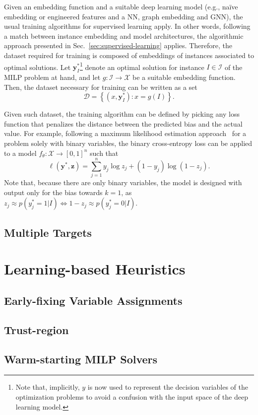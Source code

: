 Given an embedding function and a suitable deep learning model (e.g., naïve embedding or engineered features and a NN, graph embedding and GNN), the usual training algorithms for supervised learning apply.
In other words, following a match between instance embedding and model architectures, the algorithmic approach presented in Sec.~\ref{sec:supervised-learning} applies.
Therefore, the dataset required for training is composed of embeddings of instances associated to optimal solutions.
Let $\bm{y}^{*}_I$\footnote{Note that, implicitly, $y$ is now used to represent the decision variables of the optimization problems to avoid a confusion with the input space of the deep learning model.} denote an optimal solution for instance $I\in \mathcal{I}$ of the MILP problem at hand, and let $g: \mathcal{I} \longrightarrow \mathcal{X}$ be a suitable embedding function.
Then, the dataset necessary for training can be written as a set \[
    \mathcal{D} = \left\{ (x, \bm{y}^{*}_I) : x = g(I) \right\} 
.\] 

Given such dataset, the training algorithm can be defined by picking any loss function that penalizes the distance between the predicted bias and the actual value.
For example, following a maximum likelihood estimation approach~\cite{goodfellowQualitativelyCharacterizingNeural2015} for a problem solely with binary variables, the binary cross-entropy loss can be applied to a model $f_{\theta}: \mathcal{X} \longrightarrow \left[ 0,1 \right]^n$ such that
\begin{equation}
    \ell(\bm{y}^*, \bm{z}) = \sum_{j=1}^{n} y_j \log z_j + (1-y_j) \log (1 - z_j)
.\end{equation}
Note that, because there are only binary variables, the model is designed with output only for the bias towards $k=1$, as $z_j\approx p(y_j^*=1|I) \iff 1-z_j\approx p(y_j^*=0|I)$.


\subsection{Multiple Targets}



\section{Learning-based Heuristics}\label{sec:learning-based-heuristics}

\subsection{Early-fixing Variable Assignments}

\subsection{Trust-region}

\subsection{Warm-starting MILP Solvers}

